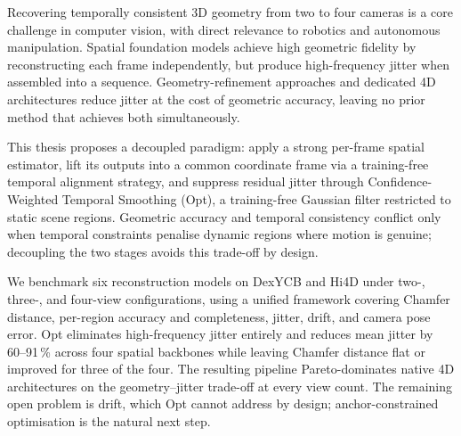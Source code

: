Recovering temporally consistent 3D geometry from two to four cameras is a core
challenge in computer vision, with direct relevance to robotics and autonomous
manipulation. Spatial foundation models achieve high geometric fidelity by
reconstructing each frame independently, but produce high-frequency jitter when
assembled into a sequence. Geometry-refinement approaches and dedicated 4D
architectures reduce jitter at the cost of geometric accuracy, leaving no prior
method that achieves both simultaneously.

This thesis proposes a decoupled paradigm: apply a strong per-frame spatial
estimator, lift its outputs into a common coordinate frame via a training-free
temporal alignment strategy, and suppress residual jitter through
Confidence-Weighted Temporal Smoothing (Opt), a training-free Gaussian filter
restricted to static scene regions. Geometric accuracy and temporal consistency
conflict only when temporal constraints penalise dynamic regions where motion is
genuine; decoupling the two stages avoids this trade-off by design.

We benchmark six reconstruction models on
DexYCB and Hi4D under two-, three-, and four-view configurations, using a unified
framework covering Chamfer distance, per-region accuracy and completeness, jitter,
drift, and camera pose error. Opt eliminates high-frequency jitter entirely and
reduces mean jitter by 60--91\,\% across four spatial backbones while leaving
Chamfer distance flat or improved for three of the four. The resulting pipeline
Pareto-dominates native 4D architectures on the geometry--jitter trade-off at
every view count. The remaining open problem is drift, which Opt
cannot address by design; anchor-constrained optimisation is the natural next step.
